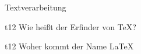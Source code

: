\begin{aufgabe}{Textverarbeitung}
   \begin{teilaufgabe}{t}{1}{2}
      Wie heißt der Erfinder von \TeX?
   \end{teilaufgabe}
   \begin{loesung}
   \end{loesung}
   \begin{teilaufgabe}{t}{1}{2}
      Woher kommt der Name \LaTeX
   \end{teilaufgabe}
   \begin{loesung}
   \end{loesung}
\end{aufgabe}
